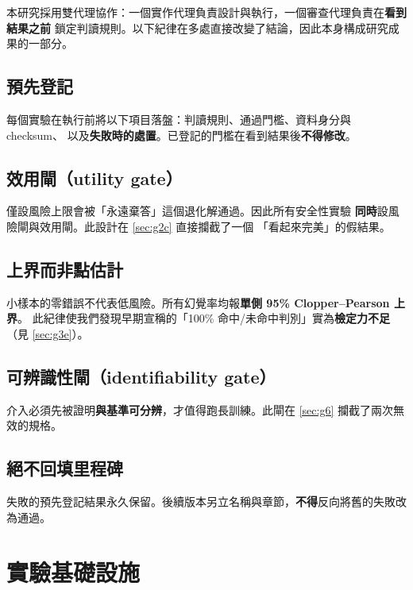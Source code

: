\documentclass[11pt, a4paper]{article}
\begin{document}
本研究採用雙代理協作：一個實作代理負責設計與執行，一個審查代理負責在\textbf{看到結果之前}
鎖定判讀規則。以下紀律在多處直接改變了結論，因此本身構成研究成果的一部分。

\subsection{預先登記}

每個實驗在執行前將以下項目落盤：判讀規則、通過門檻、資料身分與 checksum、
以及\textbf{失敗時的處置}。已登記的門檻在看到結果後\textbf{不得修改}。

\subsection{效用閘（utility gate）}

僅設風險上限會被「永遠棄答」這個退化解通過。因此所有安全性實驗
\textbf{同時}設風險閘與效用閘。此設計在 \autoref{sec:g2c} 直接攔截了一個
「看起來完美」的假結果。

\subsection{上界而非點估計}

小樣本的零錯誤不代表低風險。所有幻覺率均報\textbf{單側 95\% Clopper--Pearson 上界}。
此紀律使我們發現早期宣稱的「100\% 命中/未命中判別」實為\textbf{檢定力不足}
（見 \autoref{sec:g3e}）。

\subsection{可辨識性閘（identifiability gate）}

介入必須先被證明\textbf{與基準可分辨}，才值得跑長訓練。此閘在 \autoref{sec:g6}
攔截了兩次無效的規格。

\subsection{絕不回填里程碑}

失敗的預先登記結果永久保留。後續版本另立名稱與章節，\textbf{不得}反向將舊的失敗改為通過。

\section{實驗基礎設施}
\end{document}
